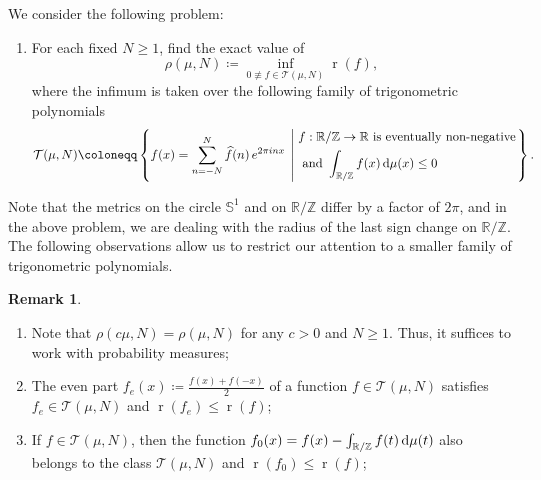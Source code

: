 \documentclass[reqno, a4paper]{amsart}
\def\R{\mathbb{R}}
\def\SS{\mathbb{S}}
\def\T{\mathbb{R}/\mathbb{Z}}
\renewcommand{\d}{\text{\rm d}}
\renewcommand{\r}{\operatorname{r}}
\theoremstyle{plain}
\theoremstyle{definition}
\theoremstyle{remarkstyle}
\newtheorem*{remark}{Remark}
\numberwithin{equation}{section}
\begin{document}
We consider the following problem:
\begin{enumerate}[label=\textbf{(P\arabic*)}, ref=(P\arabic*)]
    \item \label{prob:trig-polynomials}
    For each fixed $N\geq 1$,  find the exact value of 
    \begin{equation*}
        \rho(\mu, N)\coloneqq \inf_{0\not \equiv f\in \mathcal{T}(\mu, N) } \r(f),
    \end{equation*}
    where the infimum is taken over the following family of trigonometric polynomials
    \begin{equation*}
        \mathcal{T}(\mu, N)\coloneqq\left\{ f(x)=\sum_{n=-N}^N \widehat{f}(n) \, e^{2\pi i n x}\; \left\lvert\; 
        \begin{aligned}
        & f:\T\to\R \text{ is eventually non-negative}\\
        &\text{ and } \int_{\T} f(x)\, \d \mu(x)\leq 0  
        \end{aligned}
        \right.
        \right\}.
    \end{equation*}
\end{enumerate}
Note that the metrics on the circle $\SS^1$ and on $\T$ differ by a factor of $2\pi$, and in the above problem, we are dealing with the radius of the last sign change on $\T$. The following observations allow us to restrict our attention to a smaller family of trigonometric polynomials.
\begin{remark}\label{rem: general remarks}\hfill
    \begin{enumerate}
        \item Note that  $\rho(c\mu, N)=\rho(\mu, N)$ for any $c>0$ and $N\geq 1$. Thus, it suffices to work with probability measures;
        \item The even part $f_e(x)\coloneqq \tfrac{f(x)+f(-x)}{2}$ of a function $f\in \mathcal{T}(\mu, N)$ satisfies $f_e\in \mathcal{T}(\mu, N)$ and $\r(f_e)\leq \r(f)$;
        \item If $f\in \mathcal{T}(\mu, N)$, then the function $f_0(x)= f(x)-\int_{\T} f(t)\,\d\mu(t)$ also belongs to the class $\mathcal{T}(\mu, N)$ and $\r(f_0)\leq \r(f)$; 
    \end{enumerate}
\end{remark}
\end{document}
